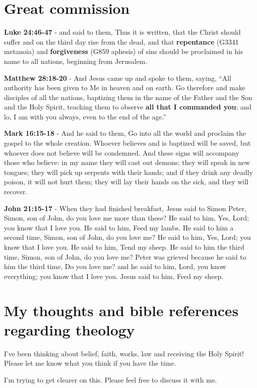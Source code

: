 \documentclass[11pt]{article}
\begin{document}
\section{Great commission}
\label{sec:orgf21225a}
\textbf{Luke 24:46-47} - and said to them, Thus it is written, that the Christ should suffer and on the third day rise from the dead, and that \textbf{repentance} (G3341 metanoia) and \textbf{forgiveness} (G859 aphesis) of sins should be proclaimed in his name to all nations, beginning from Jerusalem.

\textbf{Matthew 28:18-20} - And Jesus came up and spoke to them, saying, “All authority has been given to Me in heaven and on earth. Go therefore and make disciples of all the nations, baptizing them in the name of the Father and the Son and the Holy Spirit, teaching them to observe \textbf{all that I commanded you}; and lo, I am with you always, even to the end of the age.”

\textbf{Mark 16:15-18} - And he said to them, Go into all the world and proclaim the gospel to the whole creation. Whoever believes and is baptized will be saved, but whoever does not believe will be condemned. And these signs will accompany those who believe: in my name they will cast out demons; they will speak in new tongues; they will pick up serpents with their hands; and if they drink any deadly poison, it will not hurt them; they will lay their hands on the sick, and they will recover.

\textbf{John 21:15-17} - When they had finished breakfast, Jesus said to Simon Peter, Simon, son of John, do you love me more than these? He said to him, Yes, Lord; you know that I love you. He said to him, Feed my lambs. He said to him a second time, Simon, son of John, do you love me? He said to him, Yes, Lord; you know that I love you. He said to him, Tend my sheep. He said to him the third time, Simon, son of John, do you love me? Peter was grieved because he said to him the third time, Do you love me? and he said to him, Lord, you know everything; you know that I love you. Jesus said to him, Feed my sheep.

\section{My thoughts and bible references regarding theology}
\label{sec:org5da049c}
I've been thinking about belief, faith, works, law and receiving the Holy Spirit!
Please let me know what you think if you have the time.

I'm trying to get clearer on this.
Please feel free to discuss it with me.
\end{document}

